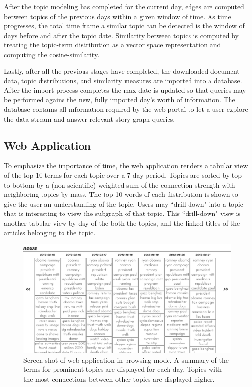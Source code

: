 \documentclass[10pt]{article}
\begin{document}
After the topic modeling has completed for the current day, edges are computed between topics of the previous days within a given window of time.  As time progresses, the total time frame a similar topic can be detected is the window of days before and after the topic date.  Similarity between topics is computed by treating the topic-term distribution as a vector space representation and computing the cosine-similarity.  

Lastly, after all the previous stages have completed, the downloaded document data, topic distributions, and similarity measures are imported into a database.  After the import process completes the max date is updated so that queries may be performed agains the new, fully imported day's worth of information.  The database contains all information required by the web portal to let a user explore the data stream and answer relevant story graph queries.

\subsection {Web Application}
To emphasize the importance of time, the web application renders a tabular view of the top 10 terms for each topic over a 7 day period.  Topics are sorted by top to bottom by a (non-scientific) weighted sum of the connection strength with neighboring topics by mass.  The top 10 words of each distribution is shown to give the user an understanding of the topic.  Users may ``drill-down" into a topic that is interesting to view the subgraph of that topic.  This ``drill-down" view is another tabular view by day of the both the topics, and the linked titles of the articles belonging to the topic.

\begin{figure}
\centering
\includegraphics[scale=0.3]{img/story-all.png}
\caption{Screen shot of web application in browsing mode.  A summary of the terms for prominent topics are displayed for each day.  Topics with the most connections between other topics are displayed higher.}
\end{figure}
\end{document}
